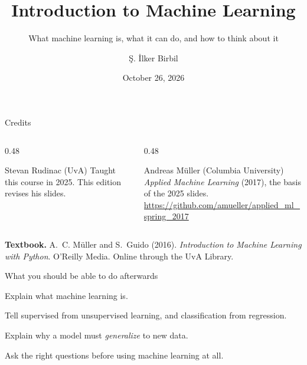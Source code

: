\documentclass[handout,aspectratio=169,t,9pt]{beamer}
\title{Introduction to Machine Learning}
\subtitle{What machine learning is, what it can do, and how to think about it}
\author{\c{S}. \.{I}lker Birbil}
\institute{University of Amsterdam}
\date{October 26, 2026}
\begin{document}

\sibtitleframe

\begin{frame}{Credits}
  \begin{columns}[T,onlytextwidth]
    \begin{column}{0.48\textwidth}
      \begin{sibbox}{Stevan Rudinac (UvA)}
        Taught this course in 2025.  This edition revises his slides.
      \end{sibbox}
    \end{column}
    \begin{column}{0.48\textwidth}
      \begin{sibbox}{Andreas M\"{u}ller (Columbia University)}
        \emph{Applied Machine Learning} (2017), the basis of the 2025
        slides.\\[2pt]
        {\scriptsize\url{https://github.com/amueller/applied_ml_spring_2017}}
      \end{sibbox}
    \end{column}
  \end{columns}

  \vspace{0.6cm}
  \textbf{Textbook.} A.~C. M\"{u}ller and S.~Guido (2016).
  \emph{Introduction to Machine Learning with Python}.  O'Reilly Media.
  Online through the UvA Library.

\end{frame}


\begin{frame}{What you should be able to do afterwards}
  \begin{objectives}
    \item Explain what machine learning is.
    \item Tell supervised from unsupervised learning, and classification
          from regression.
    \item Explain why a model must \emph{generalize} to new data.
    \item Ask the right questions before using machine learning at all.
  \end{objectives}
\end{frame}

\end{document}
